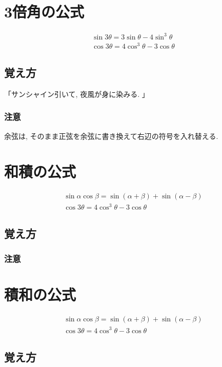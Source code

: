 \documentclass[]{jreport}
\begin{document}
\section{3倍角の公式}
\begin{equation}
    \begin{array}{l}
        \sin3\theta=3\sin\theta-4\sin^3\theta\\
        \cos3\theta=4\cos^3\theta-3\cos\theta
    \end{array}
\end{equation}
\subsection{覚え方}
「サンシャイン引いて, 夜風が身に染みる. 」
\subsubsection{注意}
余弦は, そのまま正弦を余弦に書き換えて右辺の符号を入れ替える.

\section{和積の公式}
\begin{equation}
    \begin{array}{l}
        \sin\alpha\cos\beta=\sin(\alpha+\beta)+\sin(\alpha-\beta)\\
        \cos3\theta=4\cos^3\theta-3\cos\theta
    \end{array}
\end{equation}
\subsection{覚え方}
\subsubsection{注意}

\section{積和の公式}
\begin{equation}
    \begin{array}{l}
        \sin\alpha\cos\beta=\sin(\alpha+\beta)+\sin(\alpha-\beta)\\
        \cos3\theta=4\cos^3\theta-3\cos\theta
    \end{array}
\end{equation}
\subsection{覚え方}
\end{document}
